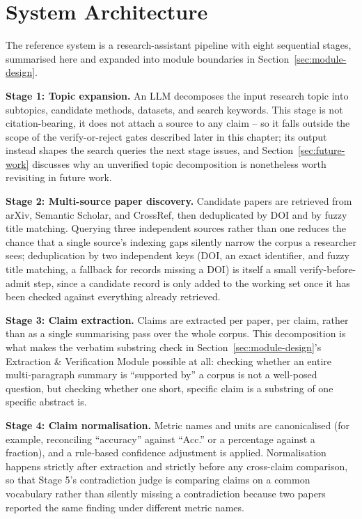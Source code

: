 \documentclass[12pt,a4paper]{report}
\begin{document}
\section{System Architecture}
\label{sec:pipeline-overview}
The reference system is a research-assistant pipeline with eight sequential
stages, summarised here and expanded into module boundaries in
Section~\ref{sec:module-design}.

\textbf{Stage 1: Topic expansion.} An LLM decomposes the input research
topic into subtopics, candidate methods, datasets, and search keywords. This
stage is not citation-bearing, it does not attach a source to any claim --
so it falls outside the scope of the verify-or-reject gates described later
in this chapter; its output instead shapes the search queries the next stage
issues, and Section~\ref{sec:future-work} discusses why an unverified topic
decomposition is nonetheless worth revisiting in future work.

\textbf{Stage 2: Multi-source paper discovery.} Candidate papers are
retrieved from arXiv, Semantic Scholar, and CrossRef, then deduplicated by DOI
and by fuzzy title matching. Querying three independent sources rather than
one reduces the chance that a single source's indexing gaps silently narrow
the corpus a researcher sees; deduplication by two independent keys (DOI, an
exact identifier, and fuzzy title matching, a fallback for records missing a
DOI) is itself a small verify-before-admit step, since a candidate record is
only added to the working set once it has been checked against everything
already retrieved.

\textbf{Stage 3: Claim extraction.} Claims are extracted per paper, per
claim, rather than as a single summarising pass over the whole corpus. This
decomposition is what makes the verbatim substring check in
Section~\ref{sec:module-design}'s Extraction \& Verification Module possible
at all: checking whether an entire multi-paragraph summary is ``supported by''
a corpus is not a well-posed question, but checking whether one short,
specific claim is a substring of one specific abstract is.

\textbf{Stage 4: Claim normalisation.} Metric names and units are
canonicalised (for example, reconciling ``accuracy'' against ``Acc.'' or a
percentage against a fraction), and a rule-based confidence adjustment is
applied. Normalisation happens strictly after extraction and strictly before
any cross-claim comparison, so that Stage 5's contradiction judge is comparing
claims on a common vocabulary rather than silently missing a contradiction
because two papers reported the same finding under different metric names.
\end{document}
